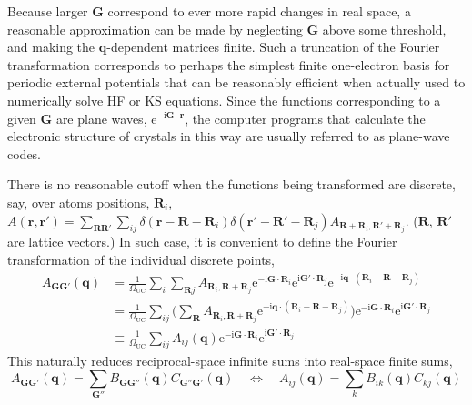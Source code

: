 Because larger $\mathbf G$ correspond to ever more rapid changes in real space, a reasonable approximation can be made by neglecting $\mathbf G$ above some threshold, and making the $\mathbf q$-dependent matrices finite.
Such a truncation of the Fourier transformation corresponds to perhaps the simplest finite one-electron basis for periodic external potentials that can be reasonably efficient when actually used to numerically solve HF or KS equations.
Since the functions corresponding to a given $\mathbf G$ are plane waves, $\mathrm e^{-\mathrm i\mathbf G\cdot\mathbf r}$, the computer programs that calculate the electronic structure of crystals in this way are usually referred to as plane-wave codes.

There is no reasonable cutoff when the functions being transformed are discrete, say, over atoms positions, $\mathbf R_i$, $A(\mathbf r,\mathbf r')=\sum_{\mathbf R\mathbf R'}\sum_{ij}\delta(\mathbf r-\mathbf R-\mathbf R_i)\delta(\mathbf r'-\mathbf R'-\mathbf R_j)A_{\mathbf R+\mathbf R_i,\mathbf R'+\mathbf R_j}$.
($\mathbf R$, $\mathbf R'$ are lattice vectors.)
In such case, it is convenient to define the Fourier transformation of the individual discrete points,
\begin{equation}
\begin{aligned}
  A_{\mathbf G\mathbf G'}(\mathbf q)&=\frac1{\Omega_\text{UC}}\sum_i\sum_{\mathbf Rj}A_{\mathbf R_i,\mathbf R+\mathbf R_j}\mathrm e^{-\mathrm i\mathbf G\cdot\mathbf R_i}\mathrm e^{\mathrm i\mathbf G'\cdot\mathbf R_j}\mathrm e^{-\mathrm i\mathbf q\cdot(\mathbf R_i-\mathbf R-\mathbf R_j)} \\
  &=\frac1{\Omega_\text{UC}}\sum_{ij}\Big(\sum_\mathbf RA_{\mathbf R_i,\mathbf R+\mathbf R_j}\mathrm e^{-\mathrm i\mathbf q\cdot(\mathbf R_i-\mathbf R-\mathbf R_j)}\Big)\mathrm e^{-\mathrm i\mathbf G\cdot\mathbf R_i}\mathrm e^{\mathrm i\mathbf G'\cdot\mathbf R_j} \\
  &\equiv\frac1{\Omega_\text{UC}}\sum_{ij}A_{ij}(\mathbf q)\mathrm e^{-\mathrm i\mathbf G\cdot\mathbf R_i}\mathrm e^{\mathrm i\mathbf G'\cdot\mathbf R_j}
\end{aligned}
\end{equation}
This naturally reduces reciprocal-space infinite sums into real-space finite sums,
\begin{equation}
  A_{\mathbf G\mathbf G'}(\mathbf q)=\sum_{\mathbf G''}B_{\mathbf G\mathbf G''}(\mathbf q)C_{\mathbf G''\mathbf G'}(\mathbf q) \quad\Leftrightarrow\quad
  A_{ij}(\mathbf q)=\sum_k B_{ik}(\mathbf q)C_{kj}(\mathbf q)
  \label{eq:fourier-discrete}
\end{equation}

